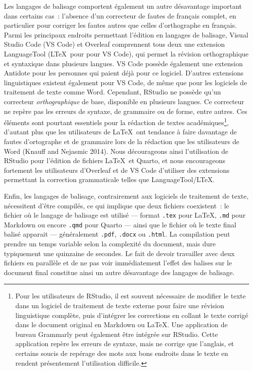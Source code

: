 \documentclass[
  letterpaper,
]{scrbook}
\begin{document}
Les langages de balisage comportent également un autre désavantage
important dans certains cas~: l'absence d'un correcteur de fautes de
français complet, en particulier pour corriger les fautes autres que
celles d'orthographe en français. Parmi les principaux endroits
permettant l'édition en langages de balisage, Visual Studio Code (VS
Code) et Overleaf comprennent tous deux une extension LanguageTool
(L\TeX~pour pour VS Code), qui permet la révision orthographique et
syntaxique dans plusieurs langues. VS Code possède également une
extension Antidote pour les personnes qui paient déjà pour ce logiciel.
D'autres extensions linguistiques existent également pour VS Code, de
même que pour les logiciels de traitement de texte comme Word.
Cependant, RStudio ne possède qu'un correcteur \emph{orthographique} de
base, disponible en plusieurs langues. Ce correcteur ne repère pas les
erreurs de syntaxe, de grammaire ou de forme, entre autres. Ces éléments
sont pourtant essentiels pour la rédaction de textes
académiques\footnote{Pour les utilisateurs de RStudio, il est souvent
  nécessaire de modifier le texte dans un logiciel de traitement de
  texte externe pour faire une révision linguistique complète, puis
  d'intégrer les corrections en collant le texte corrigé dans le
  document original en Markdown ou \LaTeX. Une application de bureau
  Grammarly peut également être intégrée sur RStudio. Cette application
  repère les erreurs de syntaxe, mais ne corrige que l'anglais, et
  certains soucis de repérage des mots aux bons endroits dans le texte
  en rendent présentement l'utilisation difficile.}, d'autant plus que
les utilisateurs de \LaTeX~ont tendance à faire davantage de fautes
d'ortographe et de grammaire lors de la rédaction que les utilisateurs
de Word (Knauff and Nejasmic 2014). Nous décourageons ainsi
l'utilisation de RStudio pour l'édition de fichiers \LaTeX~et Quarto, et
nous encourageons fortement les utilisateurs d'Overleaf et de VS Code
d'utiliser des extensions permettant la correction grammaticale telles
que LanguageTool/L\TeX.

Enfin, les langages de balisage, contrairement aux logiciels de
traitement de texte, nécessitent d'être compilés, ce qui implique que
deux fichiers coexistent~: le fichier où le langage de balisage est
utilisé --- format \texttt{.tex} pour \LaTeX, \texttt{.md} pour Markdown
ou encore \texttt{.qmd} pour Quarto --- ainsi que le fichier où le texte
final balisé apparait --- généralement \texttt{.pdf}, \texttt{.docx} ou
\texttt{.html}. La compilation peut prendre un temps variable selon la
complexité du document, mais dure typiquement une quinzaine de secondes.
Le fait de devoir travailler avec deux fichiers en parallèle et de ne
pas voir immédiatement l'effet des balises sur le document final
constitue ainsi un autre désavantage des langages de balisage.
\end{document}
